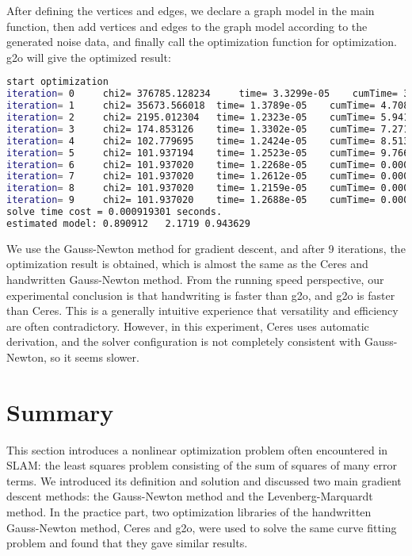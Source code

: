 After defining the vertices and edges, we declare a graph model in the main function, then add vertices and edges to the graph model according to the generated noise data, and finally call the optimization function for optimization. g2o will give the optimized result:
\begin{lstlisting}[language=sh,caption=terminal output:]
start optimization
iteration= 0	 chi2= 376785.128234	 time= 3.3299e-05	 cumTime= 3.3299e-05	 edges= 100	 schur= 0
iteration= 1	 chi2= 35673.566018	 time= 1.3789e-05	 cumTime= 4.7088e-05	 edges= 100	 schur= 0
iteration= 2	 chi2= 2195.012304	 time= 1.2323e-05	 cumTime= 5.9411e-05	 edges= 100	 schur= 0
iteration= 3	 chi2= 174.853126	 time= 1.3302e-05	 cumTime= 7.2713e-05	 edges= 100	 schur= 0
iteration= 4	 chi2= 102.779695	 time= 1.2424e-05	 cumTime= 8.5137e-05	 edges= 100	 schur= 0
iteration= 5	 chi2= 101.937194	 time= 1.2523e-05	 cumTime= 9.766e-05	 edges= 100	 schur= 0
iteration= 6	 chi2= 101.937020	 time= 1.2268e-05	 cumTime= 0.000109928	 edges= 100	 schur= 0
iteration= 7	 chi2= 101.937020	 time= 1.2612e-05	 cumTime= 0.00012254	 edges= 100	 schur= 0
iteration= 8	 chi2= 101.937020	 time= 1.2159e-05	 cumTime= 0.000134699	 edges= 100	 schur= 0
iteration= 9	 chi2= 101.937020	 time= 1.2688e-05	 cumTime= 0.000147387	 edges= 100	 schur= 0
solve time cost = 0.000919301 seconds. 
estimated model: 0.890912   2.1719 0.943629
\end{lstlisting}

We use the Gauss-Newton method for gradient descent, and after 9 iterations, the optimization result is obtained, which is almost the same as the Ceres and handwritten Gauss-Newton method. From the running speed perspective, our experimental conclusion is that handwriting is faster than g2o, and g2o is faster than Ceres. This is a generally intuitive experience that versatility and efficiency are often contradictory. However, in this experiment, Ceres uses automatic derivation, and the solver configuration is not completely consistent with Gauss-Newton, so it seems slower.

\section{Summary}
This section introduces a nonlinear optimization problem often encountered in SLAM: the least squares problem consisting of the sum of squares of many error terms. We introduced its definition and solution and discussed two main gradient descent methods: the Gauss-Newton method and the Levenberg-Marquardt method. In the practice part, two optimization libraries of the handwritten Gauss-Newton method, Ceres and g2o, were used to solve the same curve fitting problem and found that they gave similar results.

